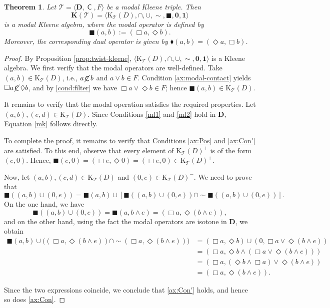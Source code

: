 \documentclass[10pt,a4paper]{amsart}
\newtheorem{theorem}{Theorem}[section]
\DeclareMathOperator{\con}{\mathsf{C}}
\DeclareMathOperator{\notcon}{\cancel{ \con}}
\newcommand{\KC}[1]{\mathrm{K}_\T(#1)}
\newcommand{\one}{\mathbf{1}}
\newcommand{\zero}{\mathbf{0}}
\newcommand{\D}{\mathbf{D}}
\newcommand{\T}{\mathcal{T}}
\newcommand{\boxn}{\blacksquare}
\newcommand{\diamon}{\blacklozenge}
\begin{document}
\begin{theorem}
\label{thm:twist-modal-kleene}
   Let $\T=\langle\D, \con, F\rangle$ be a modal Kleene triple. Then 
   \[\mathbf{K}(\T)=\langle\KC{D}, \cap, \cup, \sim, \boxn, \zero, \one\rangle\] is a modal Kleene algebra, where the modal operator is defined by
   \[
        \boxn(a,b) := (\Box a, \Diamond b).
    \]
    Moreover, the corresponding dual operator is given by $ \diamon(a,b) = (\Diamond a, \Box b)$.
\end{theorem}
\begin{proof}
    By Proposition \ref{prop:twist-kleene}, $\langle\KC{D}, \cap, \cup, \sim, \zero, \one\rangle$ is a Kleene algebra.
   We first verify that the modal operators are well-defined. Take $(a, b) \in \KC{D}$, i.e., $a\notcon b$ and $a\vee b \in F$. Condition \eqref{ax:modal-contact} yields $\Box a\notcon \Diamond b$, and by \eqref{cond:filter} we have $\Box a\vee \Diamond b\in F$; hence $\boxn(a, b) \in \KC{D}$.
   
    It remains to verify that the modal operation satisfies the required properties. Let $(a,b), (e,d) \in \KC{D}$. Since Conditions \eqref{ml1} and \eqref{ml2} hold in $\D$, Equation \eqref{mk} follows directly.
    
    To complete the proof, it remains to verify that Conditions \eqref{ax:Pos} and \eqref{ax:Con'} are satisfied. To this end, observe that every element of $\KC{D}^{+}$ is of the form $(e,0)$. Hence, $\boxn (e,0)= ( \Box e,\Diamond0)=(\Box e,0)\in \KC{D}^{+}.$
 
    Now, let $(a,b), (c,d)\in \KC{D}$ and $(0,e)\in \KC{D}^{-}$. We need to prove that 
     \[
    \boxn ((a,b)\cup (0,e))= \boxn (a,b)\cup [\boxn ((a,b)\cup (0,e))\cap \sim\boxn ((a,b)\cup (0,e))].
    \]
    On the one hand, we have
    \[
    \boxn ((a,b)\cup (0,e))= \boxn(a, b\wedge e)=(\Box a, \Diamond(b \wedge e)),
    \]
    and on the other hand, using the fact the modal operators are isotone in $\D$, we obtain
    \begin{align*}
        \boxn (a,b)\cup \big((\Box a, \Diamond(b \wedge e))\cap \sim(\Box a, \Diamond(b \wedge e))\big)
        &= (\Box a,\Diamond b) \cup (0, \Box a\vee\Diamond(b \wedge e))\\
        &= (\Box a,\Diamond b\wedge(\Box a\vee\Diamond(b \wedge e)))\\
        &= (\Box a,(\Diamond b\wedge\Box a)\vee  \Diamond(b \wedge e))\\
        &= (\Box a, \Diamond(b \wedge e)).
    \end{align*}
    
    Since the two expressions coincide, we conclude that \eqref{ax:Con'} holds, and hence so does \eqref{ax:Con}. 
\end{proof}
\end{document}
